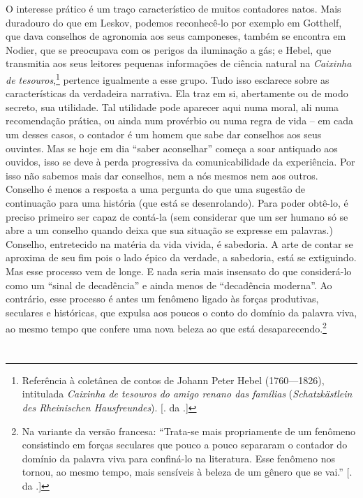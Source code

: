 O interesse prático é um traço característico de muitos contadores
natos. Mais duradouro do que em Leskov, podemos reconhecê-lo por exemplo
em Gotthelf, que dava conselhos de agronomia aos seus camponeses, também
se encontra em Nodier, que se preocupava com os perigos da iluminação a
gás; e Hebel, que transmitia aos seus leitores pequenas informações de
ciência natural na \emph{Caixinha de tesouros},\footnote{Referência à
  coletânea de contos de Johann Peter Hebel (1760---1826), intitulada
  \emph{Caixinha de tesouros do amigo renano das famílias}
  (\emph{Schatzkästlein des Rheinischen Hausfreundes}). [. da .]}
pertence igualmente a esse grupo. Tudo isso esclarece sobre as
características da verdadeira narrativa. Ela traz em si, abertamente ou
de modo secreto, sua utilidade. Tal utilidade pode aparecer aqui numa
moral, ali numa recomendação prática, ou ainda num provérbio ou numa
regra de vida -- em cada um desses casos, o contador é um homem que sabe
dar conselhos aos seus ouvintes. Mas se hoje em dia ``saber aconselhar''
começa a soar antiquado aos ouvidos, isso se deve à perda progressiva da
comunicabilidade da experiência. Por isso não sabemos mais dar
conselhos, nem a nós mesmos nem aos outros. Conselho é menos a resposta
a uma pergunta do que uma sugestão de continuação para uma história (que
está se desenrolando). Para poder obtê-lo, é preciso primeiro ser capaz
de contá-la (sem considerar que um ser humano só se abre a um conselho
quando deixa que sua situação se expresse em palavras.) Conselho,
entretecido na matéria da vida vivida, é sabedoria. A arte de contar se
aproxima de seu fim pois o lado épico da verdade\label{supra2}, a sabedoria, está se
extiguindo. Mas esse processo vem de longe. E nada seria mais insensato
do que considerá-lo como um ``sinal de decadência'' e ainda menos de
``decadência moderna''. Ao contrário, esse processo é antes um fenômeno
ligado às forças produtivas, seculares e históricas, que expulsa aos
poucos o conto do domínio da palavra viva, ao mesmo tempo que confere
uma nova beleza ao que está desaparecendo.\footnote{Na variante da
  versão francesa: ``Trata-se mais propriamente de um fenômeno
  consistindo em forças seculares que pouco a pouco separaram o contador
  do domínio da palavra viva para confiná-lo na literatura. Esse
  fenômeno nos tornou, ao mesmo tempo, mais sensíveis à beleza de um
  gênero que se vai.'' [. da .]}

\section{}

